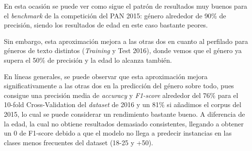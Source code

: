 En esta ocasión se puede ver como sigue el patrón de resultados muy buenos para el \textit{benchmark} de la competición del PAN 2015: género alrededor de 90\% de precisión, siendo los resultados de edad en este caso bastante peores.

Sin embargo, esta aproximación mejora a las otras dos en cuanto al perfilado para géneros de texto distintos (\textit{Training} y Test 2016), donde vemos que el género ya supera el 50\% de precisión y la edad lo alcanza también.

En líneas generales, se puede observar que esta aproximación mejora significativamente a las otras dos en la predicción del género sobre todo, pues consigue una precisión media de \textit{accuracy} y \textit{F1-score} alrededor del 76\% para el 10-fold Cross-Validation del \textit{dataset} de 2016 y un 81\% si añadimos el corpus del 2015, lo cual se puede considerar un rendimiento bastante bueno. A diferencia de la edad, la cual no obtiene resultados demasiado consistentes, llegando a obtener un 0 de F1-score debido a que el modelo no llega a predecir instancias en las clases menos frecuentes del dataset (18-25 y +50).

